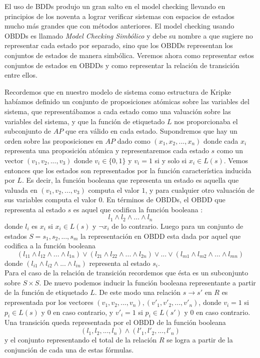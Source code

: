 \documentclass[titlepage, 12pt]{book}
\begin{document}
El uso de BDDs produjo un gran salto en el model checking llevando en principios de los noventa a lograr verificar sistemas con espacios de estados mucho m\'as grandes que con m\'etodos anteriores. El model checking usando OBDDs es llamado \textit{Model Checking Simb\'olico} y debe su nombre a que sugiere no representar cada estado por separado, sino que los OBDDs representan los conjuntos de estados de manera simb\'olica. Veremos ahora como representar estos conjuntos de estados en OBDDs y como representar la relaci\'on de transici\'on entre ellos.

Recordemos que en nuestro modelo de sistema como estructura de Kripke hab\'iamos definido un conjunto de proposiciones at\'omicas sobre las variables del sistema, que represent\'abamos a cada estado como una valuaci\'on sobre las variables del sistema, y que la funci\'on de etiquetado $L$ nos proporcionaba el subconjunto de $AP$ que era v\'alido en cada estado. Supondremos que hay un orden sobre las proposiciones en $AP$ dado como $(x_1,x_2,...,x_n)$ donde cada $x_i$ representa una proposici\'on at\'omica y representaremos cada estado $s$ como un vector $(v_1,v_2,...,v_3)$ donde $v_i \in \lbrace 0,1 \rbrace$ y $v_i = 1$ si y solo si $x_i \in L(s)$. Vemos entonces que los estados son representados por la funci\'on caracter\'istica inducida por $L$. Es decir, la funci\'on booleana que representa un estado es aquella que valuada en $(v_1,v_2,...,v_3)$ computa el valor $1$, y para cualquier otro valuaci\'on de sus variables computa el valor $0$. En t\'erminos de OBDDs, el OBDD que representa al estado $s$ es aquel que codifica la funci\'on booleana : $$l_1 \wedge l_2 \wedge ... \wedge l_n$$ donde $l_i$ es $x_i$ si $x_i \in L(s)$ y $\neg x_i$ de lo contrario. Luego para un conjunto de estados $S = {s_1, s_2, ..., s_m}$ la representaci\'on en OBDD esta dada por aquel que codifica a la funci\'on booleana $$(l_{11} \wedge l_{12} \wedge ... \wedge l_{1n}) \vee (l_{21} \wedge l_{22} \wedge ... \wedge l_{2n}) \vee ... \vee (l_{m1} \wedge l_{m2} \wedge ... \wedge l_{mn})$$ donde $(l_{i1} \wedge l_{i2} \wedge ... \wedge l_{in})$ representa al estado $s_i$.\\

Para el caso de la relaci\'on de transici\'on recordemos que \'esta es un subconjunto sobre $S\times S$. De nuevo podemos inducir la funci\'on booleana representante a partir de la funci\'on de etiquetado $L$. De este modo una relaci\'on $s\rightarrow s'$ en $R$ es representada por los vectores $(v_1,v_2,...,v_n),(v'_1,v'_2,...,v'_n)$, donde $v_i = 1$ si $p_i \in L(s)$ y $0$ en caso contrario, y $v'_i = 1$ si $p_i \in L(s')$ y $0$ en caso contrario. Una transici\'on queda representada por el OBDD de la funci\'on booleana $$(l_1,l_2,...,l_n) \wedge (l'_1,l'_2,...,l'_n)$$ y el conjunto representando el total de la relaci\'on $R$ se logra a partir de la conjunci\'on de cada una de estas f\'ormulas.
\end{document}

